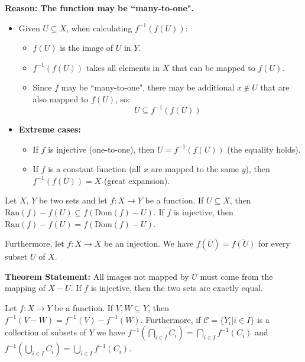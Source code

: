 \documentclass[../main.tex]{subfiles}
\begin{document}
\textbf{Reason: The function may be ``many-to-one".}
\begin{itemize}
    \item Given $U \subseteq X$, when calculating $f^{-1}(f(U))$:
    \begin{itemize}
        \item $f(U)$ is the image of $U$ in $Y$.
        \item $f^{-1}(f(U))$ takes all elements in $X$ that can be mapped to $f(U)$.
        \item Since $f$ may be ``many-to-one", there may be additional $x \notin U$ that are also mapped to $f(U)$, so:
        $$
            U \subseteq f^{-1}(f(U))
        $$
    \end{itemize}
    \item \textbf{Extreme cases:}
    \begin{itemize}
        \item If $f$ is injective (one-to-one), then $U = f^{-1}(f(U))$ (the equality holds).
        \item If $f$ is a constant function (all $x$ are mapped to the same $y$), then $f^{-1}(f(U)) = X$ (great expansion).
    \end{itemize}
\end{itemize}

\begin{yellow}
\begin{theorem}
    
Let $X$, $Y$ be two sets and let $f:X\rightarrow Y$ be a function. If $U\subseteq X$, then $\text{Ran}(f)-f(U)\subseteq f(\text{Dom}(f) - U)$. If $f$ is injective, then $\text{Ran}(f)-f(U)=f(\text{Dom}(f)-U)$. 

Furthermore, let $f:X\rightarrow X$ be an injection. We have $f(\overline U)=\overline{f(U)}$ for every subset $U$ of $X$.

\end{theorem}
\end{yellow}

\begin{green}
    
\textbf{Theorem Statement:} All images not mapped by $U$ must come from the mapping of $X-U$. If $f$ is injective, then the two sets are exactly equal.

\end{green}


\begin{yellow}
\begin{theorem}

Let $f:X\rightarrow Y$ be a function. If $V,W\subseteq Y$, then $f^{-1}(V-W)=f^{-1}(V)-f^{-1}(W)$. Furthermore, if $\mathcal{C}=\{Y_i|i\in I\}$ is a collection of subsets of $Y$ we have $f^{-1}(\bigcap_{i\in I}C_i)=\bigcap_{i\in I}f^{-1}(C_i)$ and $f^{-1}(\bigcup_{i\in I}C_i)=\bigcup_{i\in I}f^{-1}(C_i)$.

\end{theorem}
\end{yellow}
\end{document}
